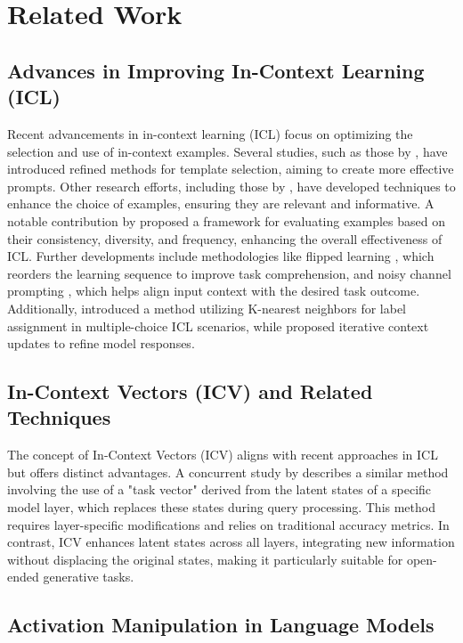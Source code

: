\section{Related Work}
\subsection{Advances in Improving In-Context Learning (ICL)}

Recent advancements in in-context learning (ICL) focus on optimizing the selection and use of in-context examples. Several studies, such as those by \cite{Yin23}, have introduced refined methods for template selection, aiming to create more effective prompts. Other research efforts, including those by \cite{Rubin22, Wan23, Wan23a}, have developed techniques to enhance the choice of examples, ensuring they are relevant and informative. A notable contribution by \cite{Ye22} proposed a framework for evaluating examples based on their consistency, diversity, and frequency, enhancing the overall effectiveness of ICL. Further developments include methodologies like flipped learning \cite{Ye22}, which reorders the learning sequence to improve task comprehension, and noisy channel prompting \cite{Min22}, which helps align input context with the desired task outcome. Additionally, \cite{Xu22} introduced a method utilizing K-nearest neighbors for label assignment in multiple-choice ICL scenarios, while \cite{Yang24} proposed iterative context updates to refine model responses. 

\subsection{In-Context Vectors (ICV) and Related Techniques}

The concept of In-Context Vectors (ICV) aligns with recent approaches in ICL but offers distinct advantages. A concurrent study by \cite{Hendel23} describes a similar method involving the use of a "task vector" derived from the latent states of a specific model layer, which replaces these states during query processing. This method requires layer-specific modifications and relies on traditional accuracy metrics. In contrast, ICV enhances latent states across all layers, integrating new information without displacing the original states, making it particularly suitable for open-ended generative tasks.

\subsection{Activation Manipulation in Language Models}

